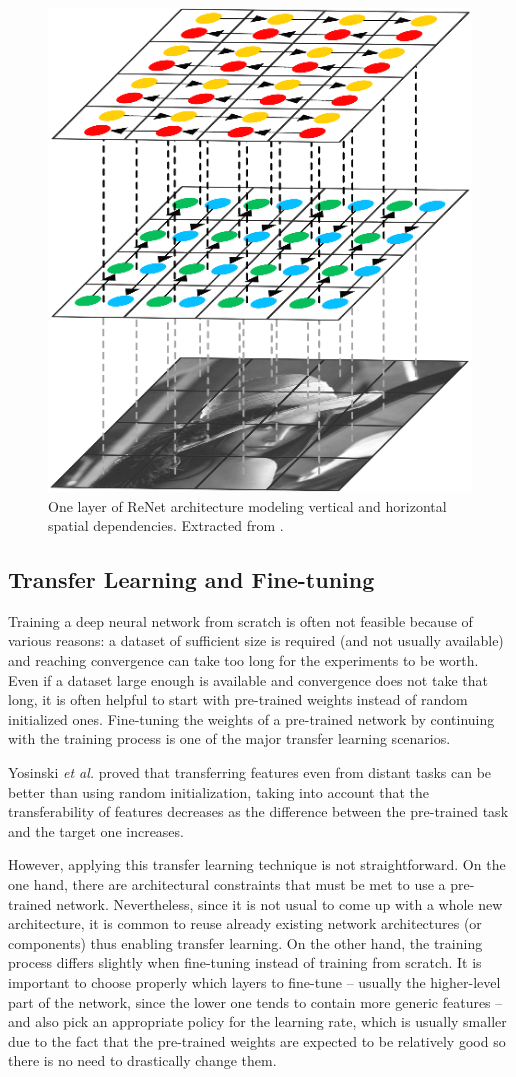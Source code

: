 \begin{figure}[!hbt]
	\centering
	\includegraphics[width=0.5\linewidth]{Figures/Segmentation/renet_rework.eps}
	\caption{One layer of ReNet architecture modeling vertical and horizontal spatial dependencies. Extracted from \cite{Visin2015}.}
	\label{fig:segmentation:renet}
\end{figure}

\subsection{Transfer Learning and Fine-tuning}

Training a deep neural network from scratch is often not feasible because of various reasons: a dataset of sufficient size is required (and not usually available) and reaching convergence can take too long for the experiments to be worth. Even if a dataset large enough is available and convergence does not take that long, it is often helpful to start with pre-trained weights instead of random initialized ones\cite{Ahmed2008}\cite{Oquab2014}. Fine-tuning the weights of a pre-trained network by continuing with the training process is one of the major transfer learning scenarios.

Yosinski \emph{et al.}\cite{Yosinski2014} proved that transferring features even from distant tasks can be better than using random initialization, taking into account that the transferability of features decreases as the difference between the pre-trained task and the target one increases.

However, applying this transfer learning technique is not straightforward. On the one hand, there are architectural constraints that must be met to use a pre-trained network. Nevertheless, since it is not usual to come up with a whole new architecture, it is common to reuse already existing network architectures (or components) thus enabling transfer learning. On the other hand, the training process differs slightly when fine-tuning instead of training from scratch. It is important to choose properly which layers to fine-tune -- usually the higher-level part of the network, since the lower one tends to contain more generic features -- and also pick an appropriate policy for the learning rate, which is usually smaller due to the fact that the pre-trained weights are expected to be relatively good so there is no need to drastically change them.

